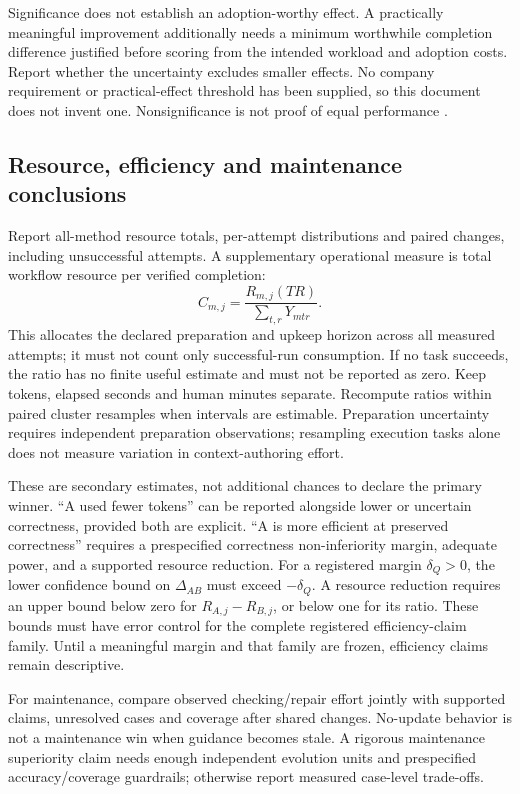 Significance does not establish an adoption-worthy effect. A practically
meaningful improvement additionally needs a minimum worthwhile completion
difference justified before scoring from the intended workload and adoption
costs. Report whether the uncertainty excludes smaller effects. No company
requirement or practical-effect threshold has been supplied, so this document
does not invent one. Nonsignificance is not proof of equal performance
\citep{lakens2017}.

\subsection{Resource, efficiency and maintenance conclusions}
Report all-method resource totals, per-attempt distributions and paired changes,
including unsuccessful attempts. A supplementary operational measure is total
workflow resource per verified completion:
\[
 C_{m,j}=\frac{R_{m,j}(TR)}{\sum_{t,r}Y_{mtr}}.
\]
This allocates the declared preparation and upkeep horizon across all measured
attempts; it must not count only successful-run consumption. If no task succeeds,
the ratio has no finite useful estimate and must not be reported as zero.
Keep tokens, elapsed seconds and human minutes separate. Recompute ratios within
paired cluster resamples when intervals are estimable. Preparation uncertainty
requires independent preparation observations; resampling execution tasks alone
does not measure variation in context-authoring effort.

These are secondary estimates, not additional chances to declare the primary
winner. ``A used fewer tokens'' can be reported alongside lower or uncertain
correctness, provided both are explicit. ``A is more efficient at preserved
correctness'' requires a prespecified correctness non-inferiority margin,
adequate power, and a supported resource reduction. For a registered margin
$\delta_Q>0$, the lower confidence bound on $\Delta_{AB}$ must exceed
$-\delta_Q$. A resource reduction requires an upper bound below zero for
$R_{A,j}-R_{B,j}$, or below one for its ratio. These bounds must have error
control for the complete registered efficiency-claim family. Until a meaningful
margin and that family are frozen, efficiency claims remain descriptive.

For maintenance, compare observed checking/repair effort jointly with supported
claims, unresolved cases and coverage after shared changes. No-update behavior
is not a maintenance win when guidance becomes stale. A rigorous maintenance
superiority claim needs enough independent evolution units and prespecified
accuracy/coverage guardrails; otherwise report measured case-level trade-offs.

